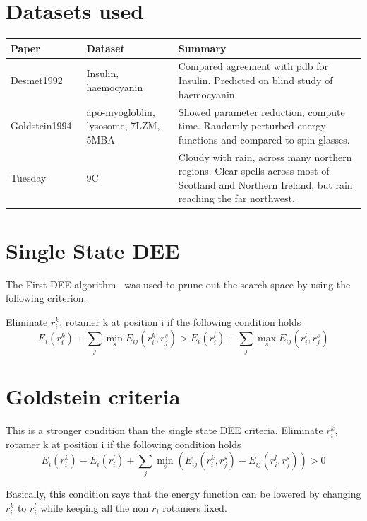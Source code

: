 \documentclass[a4]{article}
\begin{document}
\pagebreak
\newpage

\appendix


\section{Datasets used}


\begin{center}
    \begin{tabular}{ | p{3cm} | p{3cm} | p{6cm} |}
    \hline
    \textbf{Paper} & \textbf{Dataset} & \bf{Summary} \\ \hline
    Desmet1992~\cite{Desmet1992} & Insulin, haemocyanin & Compared agreement with pdb for Insulin. Predicted on blind study of haemocyanin \\ \hline
    Goldstein1994~\cite{Golstein1994} & apo-myogloblin, lysosome, 7LZM, 5MBA& Showed parameter reduction, compute time. Randomly perturbed energy functions and compared to spin glasses. \\ \hline
    Tuesday & 9C & Cloudy with rain, across many northern regions. Clear spells
    across most of Scotland and Northern Ireland,
    but rain reaching the far northwest. \\ 
    \hline
    \end{tabular}
\end{center}

\section{Single State DEE}
The First DEE algorithm~\cite{Desmet1992} was used to prune out the search space by using the following criterion. 

Eliminate $r_i^k$, rotamer k at position i if the following condition holds
\[
E_i(r_i^k) + \sum_j \min_s E_{ij}(r_i^k,r_j^s) > E_i(r_i^l) + \sum_j \max_s E_{ij}(r_i^l,r_j^s)
\]


\section{Goldstein criteria}
This is a stronger condition than the single state DEE criteria.
Eliminate $r_i^k$, rotamer k at position i if the following condition holds
\[
E_i(r_i^k) - E_i(r_i^l) + \sum_j \min_s \left(E_{ij}(r_i^k,r_j^s) - E_{ij}(r_i^l,r_j^s) \right)> 0  
\]

Basically, this condition says that the energy function can be lowered by changing $r_i^k$ to $r_i^l$ while keeping all the non $r_i$ rotamers fixed. 
\end{document}
